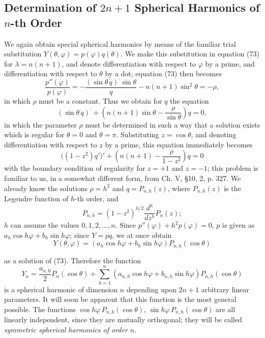 \subsection{Determination of $2n+1$ Spherical Harmonics of $n$-th Order}
We again obtain special spherical harmonics by means of the familiar trial substitution $Y(\theta,\varphi)=p(\varphi)q(\theta)$. We make this substitution in equation (73) for $\lambda=n(n+1)$, and denote differentiation with respect to $\varphi$ by a prime, and differentiation with respect to $\theta$ by a dot; equation (73) then becomes
\[
\frac{p''(\varphi)}{p(\varphi)}
=-\frac{(\sin\theta\,\dot q)^{\boldsymbol\cdot}\sin\theta}{q}
-n(n+1)\sin^2\theta=-\rho,
\]
in which $\rho$ must be a constant. Thus we obtain for $q$ the equation
\[
(\sin\theta\,\dot q)^{\boldsymbol\cdot}
+\left(n(n+1)\sin\theta-\frac{\rho}{\sin\theta}\right)q=0,
\]
in which the parameter $\rho$ must be determined in such a way that a solution exists which is regular for $\theta=0$ and $\theta=\pi$. Substituting $z=\cos\theta$, and denoting differentiation with respect to $z$ by a prime, this equation immediately becomes
\[
\bigl((1-z^2)q'\bigr)'
+\left(n(n+1)-\frac{\rho}{1-z^2}\right)q=0
\]
with the boundary condition of regularity for $z=+1$ and $z=-1$; this problem is familiar to us, in a somewhat different form, from Ch. V, \S10, 2, p. 327. We already know the solutions $\rho=h^2$ and $q=P_{n,h}(z)$, where $P_{n,h}(z)$ is the Legendre function of $h$-th order, and
\[
P_{n,h}=(1-z^2)^{h/2}\frac{d^h}{dz^h}P_n(z);
\]
$h$ can assume the values $0,1,2,\ldots,n$. Since $p''(\varphi)+h^2p(\varphi)=0$, $p$ is given as $a_h\cos h\varphi+b_h\sin h\varphi$; since $Y=pq$, we at once obtain
\[
Y(\theta,\varphi)=(a_h\cos h\varphi+b_h\sin h\varphi)P_{n,h}(\cos\theta)
\]

as a solution of (73). Therefore the function
\begin{equation}\tag{74}
Y_n=\frac{a_{n,0}}{2}P_n(\cos\theta)
+\sum_{h=1}^{n}(a_{n,h}\cos h\varphi+b_{n,h}\sin h\varphi)P_{n,h}(\cos\theta)
\end{equation}
is a spherical harmonic of dimension $n$ depending upon $2n+1$ arbitrary linear parameters. It will soon be apparent that this function is the most general possible. The functions $\cos h\varphi\,P_{n,h}(\cos\theta)$, $\sin h\varphi\,P_{n,h}(\cos\theta)$ are all linearly independent, since they are mutually orthogonal; they will be called \emph{symmetric spherical harmonics of order $n$}.


